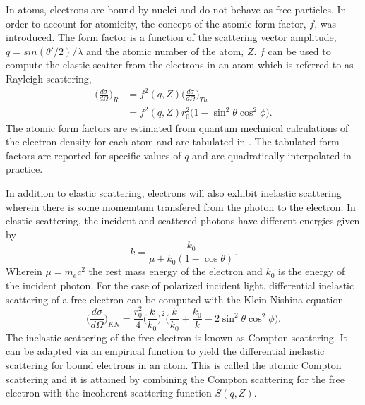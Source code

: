\documentclass{report}
\begin{document}
In atoms, electrons are bound by nuclei and do not behave as free particles. 
In order to account for atomicity, the concept of the atomic form factor, $f$, was introduced. 
The form factor is a function of the scattering vector amplitude, $q = sin(\theta'/2)/\lambda$ and the atomic number of the atom, $Z$. 
$f$ can be used to compute the elastic scatter from the electrons in an atom which is referred to as Rayleigh scattering, 
\begin{equation}
\begin{aligned}
\label{formfactor}
\bigg( \frac {d\sigma}{d\Omega} \bigg)_R &= f^2(q, Z) \bigg( \frac {d\sigma}{d\Omega} \bigg)_{Th} \\
                                         &= f^2(q, Z)  r_0^2 \bigg(1 - \sin^2 \theta \cos^2 \phi \bigg).
\end{aligned}
\end{equation}
The atomic form factors are estimated from quantum mechnical calculations of the electron density for each atom and are tabulated in \cite{Hubbell1975-fl}. The tabulated form factors are reported for specific values of $q$ and are quadratically interpolated in practice.

In addition to elastic scattering, electrons will also exhibit inelastic scattering wherein there is some momemtum transfered from the photon to the electron. 
In elastic scattering, the incident and scattered photons have different energies given by \cite{Heitler1954-vq}
\begin{equation}
k = \frac {k_0} {\mu + k_0(1 - \cos \theta)}. 
\end{equation}
Wherein $\mu = m_ec^2$ the rest mass energy of the electron and $k_0$ is the energy of the incident photon. 
For the case of polarized incident light, differential inelastic scattering of a free electron can be computed with the Klein-Nishina equation \cite{Klein1929-ic}
\begin{equation}
\label{compton}
\bigg( \frac {d\sigma}{d\Omega} \bigg)_{KN} = \frac {r_0^2} {4} \bigg(\frac{k}{k_0}\bigg)^2\bigg(\frac {k} {k_0} + \frac {k_0} {k} - 2 \sin^2 \theta \cos^2 \phi \bigg).
\end{equation}
The inelastic scattering of the free electron is known as Compton scattering. 
It can be adapted via an empirical function to yield the differential inelastic scattering for bound electrons in an atom.
This is called the atomic Compton scattering and it is attained by combining the Compton scattering for the free electron with the incoherent scattering function $S(q, Z)$.
\end{document}
